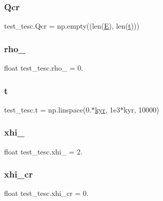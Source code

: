 \mbox{\label{namespacetest__tesc_a147569d13d6d2d9a78f0fc5dcd52b36b}} 
\subsubsection{\texorpdfstring{Qcr}{Qcr}}
{\footnotesize\ttfamily test\+\_\+tesc.\+Qcr = np.\+empty((len(\hyperlink{namespacetest__tesc_a4789c617e691141d9a78952c8e9bbe4d}{E}), len(\hyperlink{namespacetest__tesc_a29af50144139f72a17bdbed5824b3ec9}{t})))}

\mbox{\label{namespacetest__tesc_a294c18a58c1b8876749b11465aba652e}} 
\subsubsection{\texorpdfstring{rho\+\_}{rho\_0}}
{\footnotesize\ttfamily float test\+\_\+tesc.\+rho\+\_ = 0.}

\mbox{\label{namespacetest__tesc_a29af50144139f72a17bdbed5824b3ec9}} 
\subsubsection{\texorpdfstring{t}{t}}
{\footnotesize\ttfamily test\+\_\+tesc.\+t = np.\+linspace(0.$\ast$\hyperlink{namespacetest__tesc_aa91867329d3ece5446158c4d3af3ac5a}{kyr}, 1e3$\ast$kyr, 10000)}

\mbox{\label{namespacetest__tesc_af69d36c63b75bd612d425ce0386093f4}} 
\subsubsection{\texorpdfstring{xhi\+\_}{xhi\_0}}
{\footnotesize\ttfamily float test\+\_\+tesc.\+xhi\+\_ = 2.}

\mbox{\label{namespacetest__tesc_a05957682dc916c7fa6993b59b427a17d}} 
\subsubsection{\texorpdfstring{xhi\+\_\+cr}{xhi\_cr}}
{\footnotesize\ttfamily float test\+\_\+tesc.\+xhi\+\_\+cr = 0.}

